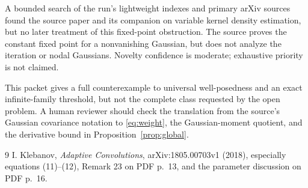 \documentclass[11pt]{article}
\theoremstyle{remark}
\begin{document}
A bounded search of the run's lightweight indexes and primary arXiv sources
found the source paper and its companion on variable kernel density estimation,
but no later treatment of this fixed-point obstruction.  The source proves the
constant fixed point for a nonvanishing Gaussian, but does not analyze the
iteration or nodal Gaussians.  Novelty confidence is moderate; exhaustive
priority is not claimed.

This packet gives a full counterexample to universal well-posedness and an exact
infinite-family threshold, but not the complete class requested by the open
problem.  A human reviewer should check the translation from the source's
Gaussian covariance notation to \eqref{eq:weight}, the Gaussian-moment quotient,
and the derivative bound in Proposition~\ref{prop:global}.

\begin{thebibliography}{9}
I. Klebanov,
\emph{Adaptive Convolutions}, arXiv:1805.00703v1 (2018), especially
equations (11)--(12), Remark 23 on PDF p.~13, and the parameter discussion on
PDF p.~16.
\end{thebibliography}
\end{document}
